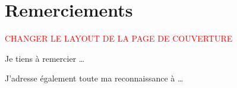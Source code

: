 \documentclass[../main.tex]{subfiles}
\begin{document}
\chapter*{Remerciements}


\textcolor{red}{CHANGER LE LAYOUT DE LA PAGE DE COUVERTURE}


Je tiens à remercier \dots

J'adresse également toute ma reconnaissance à \dots
\end{document}
